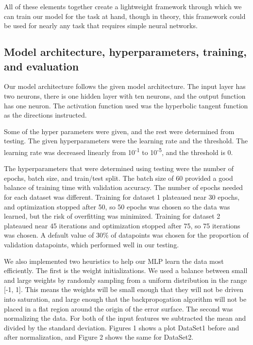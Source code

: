 \documentclass[letterpaper, 12pt]{article}
\begin{document}
All of these elements together create a lightweight framework through which we can train our model for the task at hand, though in theory, this framework could be used for nearly any task that requires simple neural networks.

\subsection{Model architecture, hyperparameters, training, and evaluation}

Our model architecture follows the given model architecture. The input layer has two neurons, there is one hidden layer with ten neurons, and the output function has one neuron. The activation function used was the hyperbolic tangent function as the directions instructed.

Some of the hyper parameters were given, and the rest were determined from testing. The given hyperparameters were the learning rate and the threshold. The learning rate was decreased linearly from 10\textsuperscript{-1} to 10\textsuperscript{-5}, and the threshold is 0.

The hyperparameters that were determined using testing were the number of epochs, batch size, and train/test split.  The batch size of 60 provided a good balance of training time with validation accuracy.  The number of epochs needed for each dataset was different.  Training for dataset 1 plateaued near 30 epochs, and optimization stopped after 50, so 50 epochs was chosen so the data was learned, but the risk of overfitting was minimized.  Training for dataset 2 plateaued near 45 iterations and optimization stopped after 75, so 75 iterations was chosen.  A default value of 30\% of datapoints was chosen  for the proportion of validation datapoints, which performed well in our testing.

We also implemented two heuristics to help our MLP learn the data most efficiently. The first is the weight initializations. We used a balance between small and large weights by randomly sampling from a uniform distribution in the range [-1, 1]. This means the weights will be small enough that they will not be driven into saturation, and large enough that the backpropogation algorithm will not be placed in a flat region around the origin of the error surface.
The second was normalizing the data.  For both of the input features we subtracted the mean and divided by the standard deviation. Figures 1 shows a plot DataSet1 before and after normalization, and Figure 2 shows the same for DataSet2.
\end{document}

